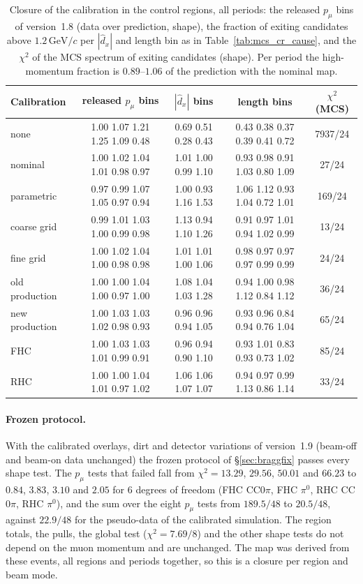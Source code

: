 \documentclass[11pt,a4paper]{article}
\newcommand{\GeVc}{\,\text{GeV}\!/c}
\begin{document}
\begin{table}[H]
  \centering\footnotesize\setlength{\tabcolsep}{3pt}
  \begin{tabular}{lcccc}
    \toprule
    Calibration & released $p_\mu$ bins & $|\hat{d}_x|$ bins & length bins & $\chi^2$ (MCS) \\
    \midrule
    none           & 1.00 1.07 1.21 1.25 1.09 0.48 & 0.69 0.51 0.28 0.43 & 0.43 0.38 0.37 0.39 0.41 0.72 & 7937/24 \\
    nominal        & 1.00 1.02 1.04 1.01 0.98 0.97 & 1.01 1.00 0.99 1.10 & 0.93 0.98 0.91 1.03 0.80 1.09 & 27/24 \\
    parametric     & 0.97 0.99 1.07 1.05 0.97 0.94 & 1.00 0.93 1.16 1.53 & 1.06 1.12 0.93 1.04 0.72 1.01 & 169/24 \\
    coarse grid    & 0.99 1.01 1.03 1.00 0.99 0.98 & 1.13 0.94 1.10 1.26 & 0.91 0.97 1.01 0.94 1.02 0.99 & 13/24 \\
    fine grid      & 1.00 1.02 1.04 1.00 0.98 0.98 & 1.01 1.01 1.00 1.06 & 0.98 0.97 0.97 0.97 0.99 0.99 & 24/24 \\
    old production & 1.00 1.00 1.04 1.00 0.97 1.00 & 1.08 1.04 1.03 1.28 & 0.94 1.00 0.98 1.12 0.84 1.12 & 36/24 \\
    new production & 1.00 1.03 1.03 1.02 0.98 0.93 & 0.96 0.96 0.94 1.05 & 0.93 0.96 0.84 0.94 0.76 1.04 & 65/24 \\
    FHC            & 1.00 1.03 1.03 1.01 0.99 0.91 & 0.96 0.94 0.90 1.10 & 0.93 1.01 0.83 0.93 0.73 1.02 & 85/24 \\
    RHC            & 1.00 1.00 1.04 1.01 0.97 1.02 & 1.06 1.06 1.07 1.07 & 0.94 0.97 0.99 1.13 0.86 1.14 & 33/24 \\
    \bottomrule
  \end{tabular}
  \caption{Closure of the calibration in the control regions, all periods: the released $p_\mu$ bins of version~1.8
    (data over prediction, shape), the fraction of exiting candidates above $1.2\GeVc$ per $|\hat{d}_x|$ and length bin
    as in Table~\ref{tab:mcs_cr_cause}, and the $\chi^2$ of the MCS spectrum of exiting candidates (shape). Per period
    the high-momentum fraction is $0.89$--$1.06$ of the prediction with the nominal map.}
  \label{tab:mcs_cr_cal}
\end{table}

\paragraph{Frozen protocol.} With the calibrated overlays, dirt and detector variations of version~1.9 (beam-off and
beam-on data unchanged) the frozen protocol of \S\ref{sec:braggfix} passes every shape test. The $p_\mu$ tests that
failed fall from $\chi^2=13.29$, $29.56$, $50.01$ and $66.23$ to $0.84$, $3.83$, $3.10$ and $2.05$ for $6$ degrees of
freedom (FHC CC$0\pi$, FHC $\pi^0$, RHC CC$0\pi$, RHC $\pi^0$), and the sum over the eight $p_\mu$ tests from $189.5/48$
to $20.5/48$, against $22.9/48$ for the pseudo-data of the calibrated simulation. The region totals, the pulls, the
global test ($\chi^2=7.69/8$) and the other shape tests do not depend on the muon momentum and are unchanged. The
map was derived from these events, all regions and periods together, so this is a closure per region and beam mode.
\end{document}
